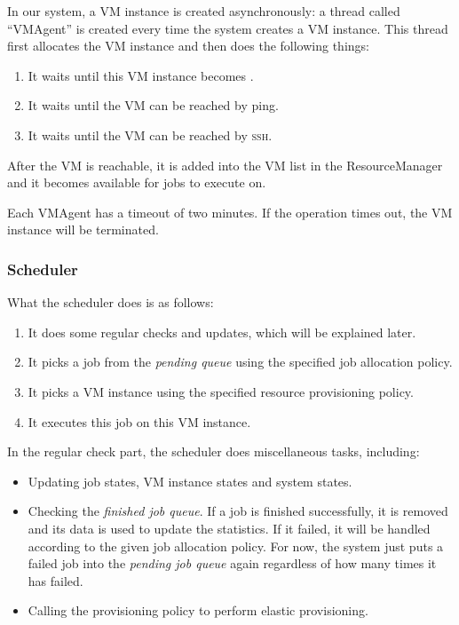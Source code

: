 In our system, a VM instance is created asynchronously: a
thread called ``VMAgent'' is created every time the system creates a
VM instance. This thread first allocates the VM instance and then
does the following things:

\begin{enumerate}
\item It waits until this VM instance becomes \staterunning.
\item It waits until the VM can be reached by ping.
\item It waits until the VM can be reached by \textsc{ssh}.
\end{enumerate}

After the VM is reachable, it is added into the VM list in the
ResourceManager and it becomes available for jobs to execute on.

Each VMAgent has a timeout of two minutes. If the operation times out,
the VM instance will be terminated.

\subsubsection{Scheduler}
What the scheduler does is as follows:

\begin{enumerate}
\item It does some regular checks and updates, which will be explained
  later.
\item It picks a job from the \emph{pending queue} using the specified
  job allocation policy.
\item It picks a VM instance using the specified resource provisioning
  policy.
\item It executes this job on this VM instance.
\end{enumerate}

In the regular check part, the scheduler does miscellaneous tasks,
including:
\begin{itemize}
\item Updating job states, VM instance states and system states.
\item Checking the \emph{finished job queue}. If a job is finished
  successfully, it is removed and its data is used to update the
  statistics. If it failed, it will be handled according to the given
  job allocation policy. For now, the system just puts a failed job into
  the \emph{pending job queue} again regardless of how many times it
  has failed.
\item Calling the provisioning policy to perform elastic provisioning.
\end{itemize}

